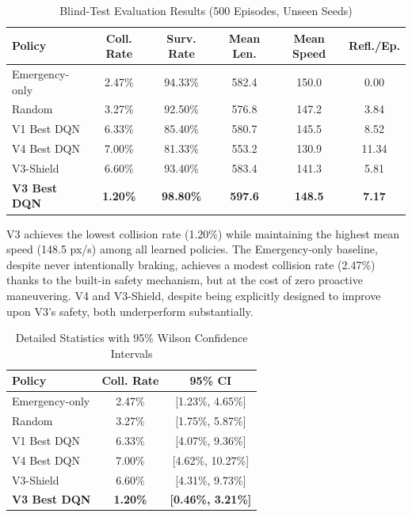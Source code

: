\documentclass[conference]{IEEEtran}
\begin{document}
\begin{table}[H]
\centering
\caption{Blind-Test Evaluation Results (500 Episodes, Unseen Seeds)}
\label{tab:blind_test}
\begin{tabular}{@{}lccccc@{}}
\toprule
\textbf{Policy} & \textbf{Coll. Rate} & \textbf{Surv. Rate} & \textbf{Mean Len.} & \textbf{Mean Speed} & \textbf{Refl./Ep.} \\
\midrule
Emergency-only  & 2.47\% & 94.33\% & 582.4 & 150.0 & 0.00 \\
Random          & 3.27\% & 92.50\% & 576.8 & 147.2 & 3.84 \\
V1 Best DQN     & 6.33\% & 85.40\% & 580.7 & 145.5 & 8.52 \\
V4 Best DQN     & 7.00\% & 81.33\% & 553.2 & 130.9 & 11.34 \\
V3-Shield       & 6.60\% & 93.40\% & 583.4 & 141.3 & 5.81 \\
\textbf{V3 Best DQN} & \textbf{1.20\%} & \textbf{98.80\%} & \textbf{597.6} & \textbf{148.5} & \textbf{7.17} \\
\bottomrule
\end{tabular}
\end{table}

V3 achieves the lowest collision rate (1.20\%) while maintaining the highest mean speed (148.5 px/s) among all learned policies. The Emergency-only baseline, despite never intentionally braking, achieves a modest collision rate (2.47\%) thanks to the built-in safety mechanism, but at the cost of zero proactive maneuvering. V4 and V3-Shield, despite being explicitly designed to improve upon V3's safety, both underperform substantially.

\begin{table}[H]
\centering
\caption{Detailed Statistics with 95\% Wilson Confidence Intervals}
\label{tab:wilson}
\begin{tabular}{@{}lcc@{}}
\toprule
\textbf{Policy} & \textbf{Coll. Rate} & \textbf{95\% CI} \\
\midrule
Emergency-only  & 2.47\% & [1.23\%, 4.65\%] \\
Random          & 3.27\% & [1.75\%, 5.87\%] \\
V1 Best DQN     & 6.33\% & [4.07\%, 9.36\%] \\
V4 Best DQN     & 7.00\% & [4.62\%, 10.27\%] \\
V3-Shield       & 6.60\% & [4.31\%, 9.73\%] \\
\textbf{V3 Best DQN} & \textbf{1.20\%} & \textbf{[0.46\%, 3.21\%]} \\
\bottomrule
\end{tabular}
\end{table}
\end{document}
